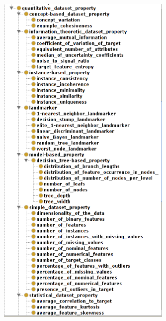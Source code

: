 \documentclass[a4paper,12pt, english]{article}
\begin{document}
\begin{figure}[h]   
  \centering 
  \includegraphics[width=0.75\textwidth]{figs/expose2-2}
  \caption{}
  \label{fig:expose2-2}
\end{figure}
\end{document}
